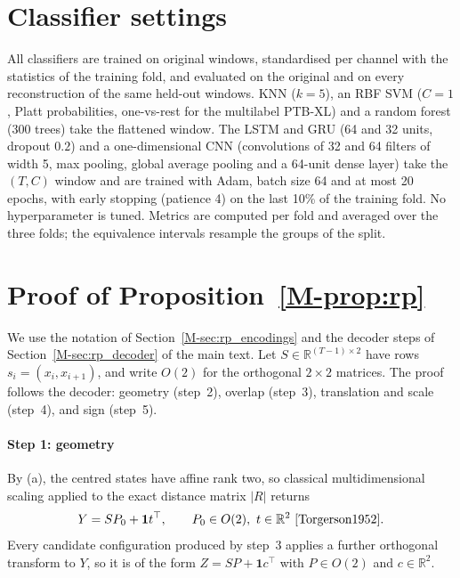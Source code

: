 \documentclass[preprint,12pt]{elsarticle}
\newcommand{\partheading}[1]{\bigskip\noindent{\large\bfseries #1}\par\nobreak\smallskip}
\begin{document}
\section{Classifier settings}\label{sec:s_classifiers}
All classifiers are trained on original windows, standardised per channel with the statistics of the training fold, and evaluated on the original and on every reconstruction of the same held-out windows. KNN ($k=5$), an RBF SVM ($C=1$, Platt probabilities, one-vs-rest for the multilabel PTB-XL) and a random forest (300 trees) take the flattened window. The LSTM and GRU (64 and 32 units, dropout $0.2$) and a one-dimensional CNN (convolutions of 32 and 64 filters of width 5, max pooling, global average pooling and a 64-unit dense layer) take the $(T,C)$ window and are trained with Adam, batch size 64 and at most 20 epochs, with early stopping (patience 4) on the last 10\% of the training fold. No hyperparameter is tuned. Metrics are computed per fold and averaged over the three folds; the equivalence intervals resample the groups of the split.

\partheading{Part B. Proposition~\ref{M-prop:rp}}

\section{Proof of Proposition~\ref{M-prop:rp}}\label{sec:s_proof}
We use the notation of Section~\ref{M-sec:rp_encodings} and the decoder steps of Section~\ref{M-sec:rp_decoder} of the main text. Let $S\in\mathbb R^{(T-1)\times2}$ have rows $s_i=(x_i,x_{i+1})$, and write $O(2)$ for the orthogonal $2\times2$ matrices. The proof follows the decoder: geometry (step~2), overlap (step~3), translation and scale (step~4), and sign (step~5).

\paragraph{Step 1: geometry}
By (a), the centred states have affine rank two, so classical multidimensional scaling applied to the exact distance matrix $|R|$ returns
\begin{equation}
Y=SP_0+\mathbf 1t^\top,\qquad P_0\in O(2),\ t\in\mathbb R^2~\cite{Torgerson1952}.
\end{equation}
Every candidate configuration produced by step~3 applies a further orthogonal transform to $Y$, so it is of the form $Z=SP+\mathbf 1c^\top$ with $P\in O(2)$ and $c\in\mathbb R^2$.
\end{document}
